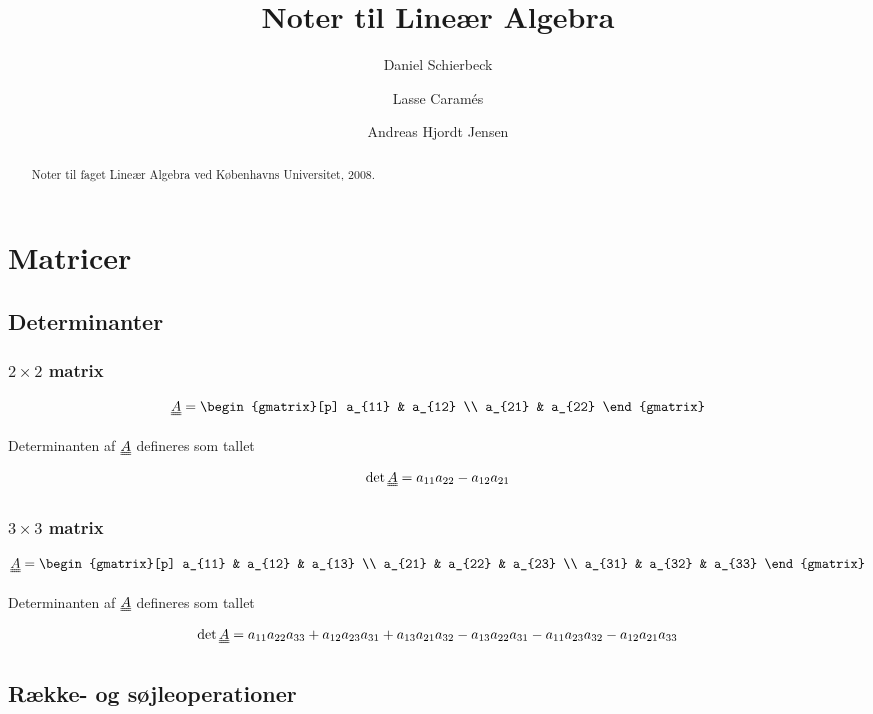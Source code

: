 \documentclass[a4paper]{article}
\title{Noter til Lineær Algebra}
\author{Daniel Schierbeck \and Lasse Caramés \and Andreas Hjordt Jensen}
\newcommand{\mtx}[1]{\uuline{#1}}
\begin{document}
\maketitle

\begin{abstract}
Noter til faget Lineær Algebra ved Københavns Universitet, 2008.
\end{abstract}

\tableofcontents

\section{Matricer}

\subsection{Determinanter}

\subsubsection{$2 \times 2$ matrix}
$$
\mtx{A} =
\begin{gmatrix}[p]
    a_{11} & a_{12} \\
    a_{21} & a_{22}
\end{gmatrix}
$$

Determinanten af $\mtx{A}$ defineres som tallet
$$
\det{\mtx{A}} = a_{11}a_{22} - a_{12}a_{21}
$$


\subsubsection{$3 \times 3$ matrix}
$$
\mtx{A} =
\begin{gmatrix}[p]
    a_{11} & a_{12} & a_{13} \\
    a_{21} & a_{22} & a_{23} \\
    a_{31} & a_{32} & a_{33}
\end{gmatrix}
$$

Determinanten af $\mtx{A}$ defineres som tallet
$$
\det{\mtx{A}} = a_{11}a_{22}a_{33} + a_{12}a_{23}a_{31} + a_{13}a_{21}a_{32} - a_{13}a_{22}a_{31} - a_{11}a_{23}a_{32} - a_{12}a_{21}a_{33}
$$


\subsection{Række- og søjleoperationer}
\end{document}
